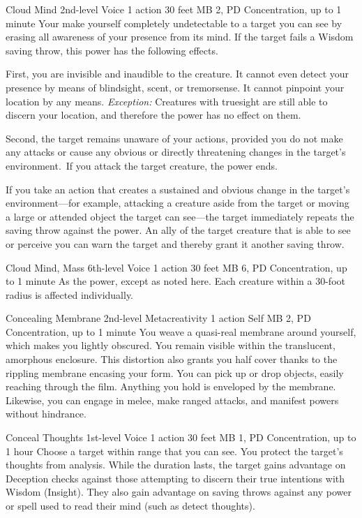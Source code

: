 \DndPowerHeader%
  {Cloud Mind}
  {2nd-level Voice}
  {1 action}
  {30 feet}
  {MB 2, PD \lvltwo}
  {Concentration, up to 1 minute}
Your make yourself completely undetectable to a target
you can see
by erasing all awareness of your presence from its mind.
If the target fails a Wisdom saving throw,
this power has the following effects.

First, you are invisible and inaudible to the creature.
It cannot even detect your presence by means of blindsight,
scent, or tremorsense.
It cannot pinpoint your location by any means.
\textit{Exception:} Creatures with truesight are still
able to discern your location,
and therefore the power has no effect on them.
  
Second, the target remains unaware of your actions,
provided you do not make any attacks or cause any obvious
or directly threatening changes in the target's environment.\
If you attack the target creature, the power ends.
  
If you take an action that creates a sustained and obvious change
in the target's environment---for example, attacking a creature
aside from the target or moving a large or attended object
the target can see---the target immediately repeats the
saving throw against the power.
An ally of the target creature that is able to see or perceive you
can warn the target and thereby grant it another saving throw.

\DndPowerHeader%
  {Cloud Mind, Mass}
  {6th-level Voice}
  {1 action}
  {30 feet}
  {MB 6, PD \lvlsix}
  {Concentration, up to 1 minute}
As the  power,
except as noted here.
Each creature within a 30-foot radius
is affected individually.

\DndPowerHeader%
  {Concealing Membrane}
  {2nd-level Metacreativity}
  {1 action}
  {Self}
  {MB 2, PD \lvltwo}
  {Concentration, up to 1 minute}
  You weave a quasi-real membrane around yourself,
  which makes you lightly obscured.
  You remain visible within the translucent, amorphous enclosure.
  This distortion also grants you half cover
  thanks to the rippling membrane encasing your form.
  You can pick up or drop objects, easily reaching through the film.
  Anything you hold is enveloped by the membrane.
  Likewise, you can engage in melee, make ranged attacks,
  and manifest powers without hindrance.

\DndPowerHeader%
  {Conceal Thoughts}
  {1st-level Voice}
  {1 action}
  {30 feet}
  {MB 1, PD \lvlone}
  {Concentration, up to 1 hour}
Choose a target within range that you can see.
You protect the target's thoughts from analysis.
While the duration lasts, the target gains advantage on
Deception checks against those attempting to discern their
true intentions with Wisdom (Insight).
They also gain advantage on saving throws
against any power or spell
used to read their mind (such as detect thoughts).

